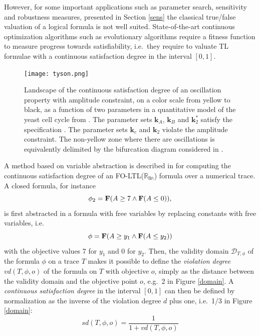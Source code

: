\documentclass[graybox]{svmult}
\newcommand{\vct}[1]{\bm{#1}}
\newcommand{\cl}[1]{\mathcal{#1}}
\def\Rlin{\mathbb{R_{\mbox{lin}}}}
\def\F{{\bf F}}
\begin{document}
However, for some important applications such as parameter search, sensitivity and robustness measures, presented in Section \ref{sens}
the classical true/false valuation of a logical formula is not well suited.
State-of-the-art continuous optimization algorithms
such as evolutionary algorithms require a fitness function
to measure progress towards satisfiability,
i.e.~they require to valuate TL formulae with a continuous satisfaction degree in the interval $[0,1]$.


\begin{centering}
\begin{figure}[htb]
\centering
\texttt{[image: tyson.png]}
\caption{Landscape of the continuous satisfaction degree of an oscillation property with amplitude constraint,
on a color scale from yellow to black,
as a function of two parameters in a quantitative model of the yeast cell cycle from \cite{Tyson91pnas}. 
The parameter sets $\vct{k}_A$, $\vct{k}_B$ and $\vct{k}_2^*$
satisfy the specification \cite{RBFS11tcs}. 
The parameter sets $\vct{k}_c$ and $\vct{k}_2$ violate the amplitude constraint.
The non-yellow zone where there are oscillations is equivalently delimited by the bifurcation diagram considered in \cite{Tyson91pnas}. 
}
\label{tyson}
\end{figure}
\end{centering}



A method based on variable abstraction is described in \cite{RBFS09bi,RBFS11tcs} for computing the continuous satisfaction degree 
of an FO-LTL($\Rlin$) formula over a numerical trace.
A closed formula, for instance
$$\phi_2=\F(A\ge 7\wedge\F(A\le 0)),$$
is first abstracted in a formula with free variables by replacing constants with free variables, 
i.e.~$$\phi=\F(A\ge y_1\wedge\F(A\le y_2))$$
with the objective values 7 for $y_1$ and 0 for $y_2$.
Then, the validity domain $\cl{D}_{T, \phi}$ of the formula $\phi$ on a trace $T$
makes it possible to define the {\em violation degree} $vd(T,\phi,o)$ of the formula on $T$ with objective $o$,
simply as the distance between the validity domain and the objective point $o$, 
e.g.~2 in Figure \ref{domain}.
A {\em continuous satisfaction degree} in the interval $[0,1]$
can then be defined by normalization as the inverse 
of the violation degree $d$ plus one, i.e.~1/3 in Figure \ref{domain}:
$$sd(T,\phi,o)={\frac1{1+vd(T,\phi,o)}}$$
\end{document}
